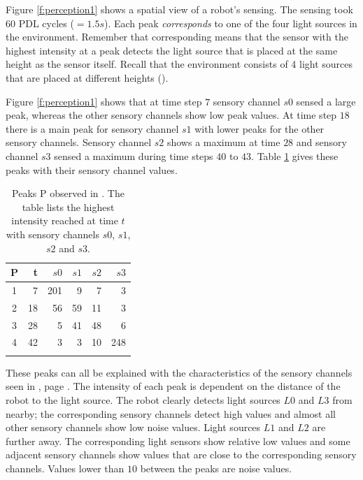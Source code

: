 
Figure \ref{f:perception1} shows a spatial view of a robot's sensing. The sensing took $60$ PDL cycles ($=1.5 s$). Each peak {\em corresponds} to one of the four light sources in the environment. Remember that corresponding means that the sensor with the highest intensity at a peak detects the light source that is placed at the same height as the sensor itself. Recall that the environment consists of 4 light sources that are placed at different heights (). 

Figure \ref{f:perception1} shows that at time step $7$ sensory channel $s0$ sensed a large peak, whereas the other sensory channels show low peak values. At time step $18$ there is a main peak  for sensory channel $s1$ with lower peaks for the other sensory channels. Sensory channel $s2$ shows a maximum at time $28$ and sensory channel $s3$ sensed a maximum during time steps $40$ to $43$. Table \ref{t:perception1} gives these peaks with their sensory channel values.

\begin{table}
\centering
\begin{tabular}{crrrrr}
\lsptoprule
P & t & $s0$ & $s1$ & $s2$ & $s3$\\
\midrule
1 & 7 & 201 & 9 & 7 & 3\\
2 & 18 & 56 & 59 & 11 & 3\\
3 & 28 & 5 & 41 & 48 & 6\\
4 & 42 & 3 & 3 & 10 & 248\\
\lspbottomrule
\end{tabular}
\caption{Peaks P observed in . The table lists the highest intensity reached at time $t$ with sensory channels $s0$, $s1$, $s2$ and $s3$.}
\label{t:perception1}
\end{table}

These peaks can all be explained with the characteristics of the sensory channels seen in , page \pageref{f:robots:calibration}.  The intensity of each peak is dependent on the distance of the robot to the light source. The robot clearly detects light sources $L0$ and $L3$ from nearby; the corresponding sensory channels detect high values and almost all other sensory channels show low noise values. Light sources $L1$ and $L2$ are further away. The corresponding light sensors show relative low values and some adjacent sensory channels show values that are close to the corresponding sensory channels. Values lower than $10$ between the peaks are noise values.

